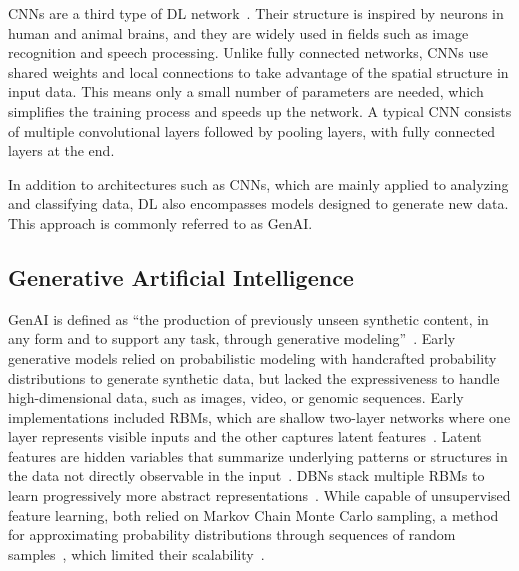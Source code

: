 \documentclass[
english,                 %
bibtex,                  %
includeExtraAbstracts, %
]{kththesis}
\numberwithin{listing}{chapter}
\begin{document}
\Glspl{CNN} are a third type of \gls{DL} network~\cite{alzubaidi_review_2021}. Their structure is inspired by neurons in human and animal brains, and they are widely used in fields such as image recognition and speech processing. Unlike fully connected networks, \glspl{CNN} use shared weights and local connections to take advantage of the spatial structure in input data. This means only a small number of parameters are needed, which simplifies the training process and speeds up the network. A typical \gls{CNN} consists of multiple convolutional layers followed by pooling layers, with fully connected layers at the end.

In addition to architectures such as \glspl{CNN}, which are mainly applied to analyzing and classifying data, \gls{DL} also encompasses models designed to generate new data. This approach is commonly referred to as \gls{GenAI}.

\subsection{Generative Artificial Intelligence}

\Gls{GenAI} is defined as “the production of previously unseen synthetic content, in any form and to support any task, through generative modeling”~\cite{garcia_penalvo_what_2023}. Early generative models relied on probabilistic modeling with handcrafted probability distributions to generate synthetic data, but lacked the expressiveness to handle high-dimensional data, such as images, video, or genomic sequences. Early implementations included \glspl{RBM}, which are shallow two-layer networks where one layer represents visible inputs and the other captures latent features~\cite{hinton_fast_2006}. Latent features are hidden variables that summarize underlying patterns or structures in the data not directly observable in the input~\cite{jim_dowling_building_2025}. \Glspl{DBN} stack multiple \glspl{RBM} to learn progressively more abstract representations~\cite{schmidhuber_deep_2015}. While capable of unsupervised feature learning, both relied on Markov Chain Monte Carlo sampling, a method for approximating probability distributions through sequences of random samples~\cite{metropolis_equation_1953}, which limited their scalability~\cite{trigka_evolution_2025}.
\end{document}
